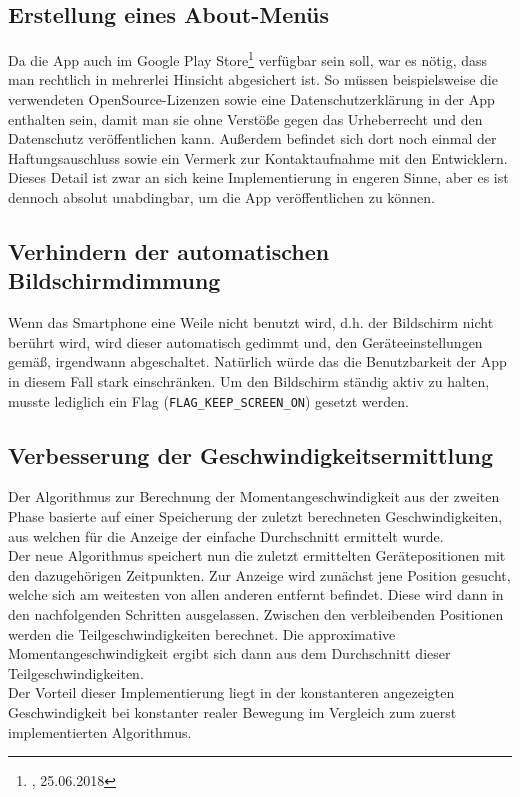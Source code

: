 \documentclass[12pt,a4paper,ngerman,enabledeprecatedfontcommands]{scrreprt}
\begin{document}
\subsection{Erstellung eines About-Menüs}
Da die \gls{App} auch im Google Play Store\footnote{, 25.06.2018} verfügbar sein soll, war es nötig, dass man rechtlich in mehrerlei Hinsicht abgesichert ist. So müssen beispielsweise die verwendeten OpenSource-Lizenzen sowie eine Datenschutzerklärung in der \gls{App} enthalten sein, damit man sie ohne Verstöße gegen das Urheberrecht und den Datenschutz veröffentlichen kann. Außerdem befindet sich dort noch einmal der Haftungsauschluss sowie ein Vermerk zur Kontaktaufnahme mit den Entwicklern.\\
Dieses Detail ist zwar an sich keine Implementierung in engeren Sinne, aber es ist dennoch absolut unabdingbar, um die App veröffentlichen zu können.\\

\subsection{Verhindern der automatischen Bildschirmdimmung}
Wenn das \gls{Smartphone} eine Weile nicht benutzt wird, d.h. der Bildschirm nicht berührt wird, wird dieser automatisch gedimmt und, den Geräteeinstellungen gemäß, irgendwann abgeschaltet. Natürlich würde das die Benutzbarkeit der \gls{App} in diesem Fall stark einschränken. Um den Bildschirm ständig aktiv zu halten, musste lediglich ein Flag (\texttt{FLAG\_KEEP\_SCREEN\_ON}) gesetzt werden.\\

\subsection{Verbesserung der Geschwindigkeitsermittlung}
\label{subsec:verbesserung-geschwindigkeitsermittlung}
Der Algorithmus zur Berechnung der Momentangeschwindigkeit aus der zweiten Phase basierte auf einer Speicherung der zuletzt berechneten Geschwindigkeiten, aus welchen für die Anzeige der einfache Durchschnitt ermittelt wurde.\\
Der neue Algorithmus speichert nun die zuletzt ermittelten Gerätepositionen mit den dazugehörigen Zeitpunkten. Zur Anzeige wird zunächst jene Position gesucht, welche sich am weitesten von allen anderen entfernt befindet. Diese wird dann in den nachfolgenden Schritten ausgelassen. Zwischen den verbleibenden Positionen werden die Teilgeschwindigkeiten berechnet. Die approximative Momentangeschwindigkeit ergibt sich dann aus dem Durchschnitt dieser Teilgeschwindigkeiten.\\
Der Vorteil dieser Implementierung liegt in der konstanteren angezeigten Geschwindigkeit bei konstanter realer Bewegung im Vergleich zum zuerst implementierten Algorithmus.\\
\end{document}
